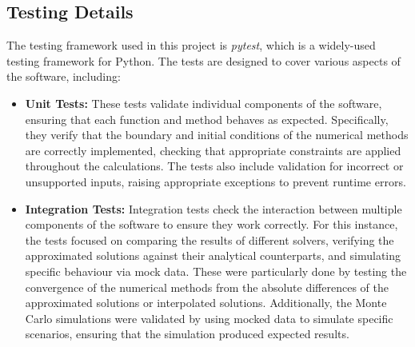 \subsection{Testing Details}
The testing framework used in this project is \textit{pytest}, which is a widely-used testing framework for Python. The tests are designed to cover various aspects of the software, including:
\begin{itemize}
    \item \textbf{Unit Tests:} These tests validate individual components of the software, ensuring that each function and method behaves as expected. Specifically, they verify that the boundary and initial conditions of the numerical methods are correctly implemented, checking that appropriate constraints are applied throughout the calculations. The tests also include validation for incorrect or unsupported inputs, raising appropriate exceptions to prevent runtime errors.
    \item \textbf{Integration Tests:} Integration tests check the interaction between multiple components of the software to ensure they work correctly. For this instance, the tests focused on comparing the results of different solvers, verifying the approximated solutions against their analytical counterparts, and simulating specific behaviour via mock data. These were particularly done by testing the convergence of the numerical methods from the absolute differences of the approximated solutions or interpolated solutions. Additionally, the Monte Carlo simulations were validated by using mocked data to simulate specific scenarios, ensuring that the simulation produced expected results. 
\end{itemize}
